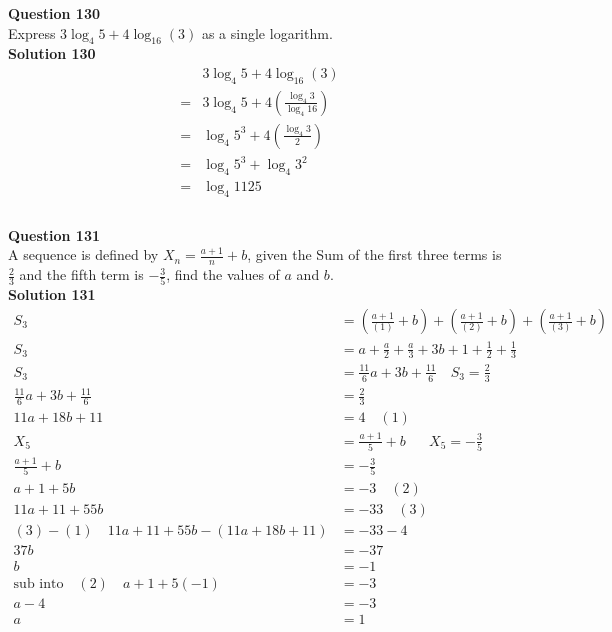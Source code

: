\documentclass{article}
\begin{document}
\noindent\textbf{Question 130}\\[5pt]
Express $3\log_{4}5+4\log_{16}(3)$ as a single logarithm.\\[5pt]
\noindent\textbf{Solution 130}\\[5pt]
\begin{align*}
&3\log_{4}5+4\log_{16}(3)\\[2pt]
=&3\log_{4}5+4\left(\displaystyle\frac{\log_{4}3}{\log_{4}16}\right)\\[2pt]
=&\log_{4}5^3+4\left(\displaystyle\frac{\log_{4}3}{2}\right)\\[2pt]
=&\log_{4}5^3+\log_{4}3^2\\[2pt]
=&\log_{4}1125\\[-120pt]
\end{align*}\\[10pt]

\noindent\textbf{Question 131}\\[5pt]
A sequence is defined by $X_n=\displaystyle\frac{a+1}{n}+b$, given the Sum of the first three terms is $\displaystyle\frac{2}{3}$ and the fifth term is $-\displaystyle\frac{3}{5}$, find the values of $a$ and $b$.\\[5pt]
\noindent\textbf{Solution 131}\\[5pt]
\begin{align*}
S_3&=\left(\displaystyle\frac{a+1}{(1)}+b\right)+\left(\displaystyle\frac{a+1}{(2)}+b\right)+\left(\displaystyle\frac{a+1}{(3)}+b\right)\\[2pt]
S_3&=a+\displaystyle\frac{a}{2}+\displaystyle\frac{a}{3}+3b+1+\displaystyle\frac{1}{2}+\frac{1}{3}\\[2pt]
S_3&=\displaystyle\frac{11}{6}a+3b+\frac{11}{6}\quad S_3=\frac{2}{3}\\[2pt]
\displaystyle\frac{11}{6}a+3b+\frac{11}{6}&=\frac{2}{3}\\[2pt]
11a+18b+11&=4\quad(1)\\[12pt]
X_5&=\displaystyle\frac{a+1}{5}+b\hspace{20pt}X_5=-\frac{3}{5}\\[2pt]
\displaystyle\frac{a+1}{5}+b&=-\frac{3}{5}\\[2pt]
a+1+5b&=-3 \quad (2)\\[2pt]
11a+11+55b&=-33\quad (3)\\[12pt]
(3)-(1)\quad 11a+11+55b-(11a+18b+11)&=-33-4\\[2pt]
37b&=-37\\[2pt]
b&=-1\\[12pt]
\text{sub into}\quad (2) \quad a+1+5(-1)&=-3\\[2pt]
a-4&=-3\\[2pt]
a&=1
\end{align*}\\[10pt]
\end{document}

